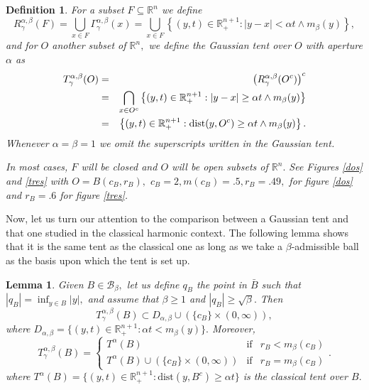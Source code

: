 \documentclass[leqno,11pt]{amsart}
\theoremstyle{plain}
\newtheorem{lemma}{Lemma}
\newtheorem{defi}{Definition}
\theoremstyle{remark}
\begin{document}
{\begin{defi}
For a subset $F\subseteq \mathbb{R}^n$ we define
\begin{equation}
R^{\alpha,\beta}_\gamma(F)=\bigcup_{x\in F} \Gamma_\gamma^{\alpha,\beta}(x)=\bigcup_{x\in F}\left\{(y,t)\in \mathbb{R}^{n+1}_+: |y-x|<\alpha t\wedge m_\beta(y)\right\},
\end{equation}
and for $O$ another subset of $\mathbb{R}^n,$ we define the \emph{Gaussian tent over} $O$ \emph{with aperture} $\alpha$ as
\begin{eqnarray}
 \nonumber  T^{\alpha, \beta}_\gamma(O)&=&\left(R^{\alpha, \beta}_\gamma (O^c)\right)^c\\
   \nonumber    &=&\bigcap_{x\in O^c}\left\{(y,t)\in \mathbb{R}^{n+1}_+: |y-x|\geq\alpha t\wedge m_\beta (y)\right\}\\
    &=&\left\{(y,t)\in \mathbb{R}^{n+1}_+: \hbox{dist}(y,O^c)\geq\alpha t\wedge m_\beta (y)\right\}.
\end{eqnarray}
Whenever $\alpha=\beta=1$ we omit the superscripts written in the Gaussian tent. 

\noindent In most cases, $F$ will be closed and $O$ will be open subsets of $\mathbb{R}^n.$ See Figures \ref{dos} and \ref{tres} with $O=B(c_B, r_B),$ $c_B=2, m(c_B)=.5, r_B=.49,$ for figure \ref{dos} and $r_B=.6$ for figure \ref{tres}.
\end{defi}



Now, let us turn our attention to the comparison between a Gaussian tent and that one studied in the classical harmonic context. The following lemma shows that it is the same tent as the classical one as long as we take a $\beta$-admissible ball as the basis upon which the tent is set up.
\begin{lemma}\label{GaussTent}
Given $B\in \mathscr{B}_\beta,$ let us define $q_B$ the point in $\bar{B}$ such that $|q_B|=\inf_{y\in B}|y|,$ and assume that $\beta\ge 1$ and $|q_B|\ge \sqrt{\beta}.$ Then $$T_\gamma^{\alpha, \beta}(B)\subset D_{\alpha, \beta}\cup (\{c_B\}\times (0, \infty)),$$ where $D_{\alpha,\beta}=\{(y,t)\in \mathbb{R}^{n+1}_+: \alpha t<m_\beta(y)\}.$ Moreover,
\begin{equation*}
T_\gamma^{\alpha, \beta}(B)=
\left\{\begin{array}{ccl}
T^\alpha(B) & \text{if} & r_B<m_\beta(c_B)\\
T^\alpha (B)\cup (\{c_B\}\times (0, \infty)) & \text{if} & r_B=m_\beta(c_B)
\end{array}\right. .
\end{equation*}
where  $T^\alpha(B)=\{(y,t)\in \mathbb{R}^{n+1}_+:\text{dist}(y,B^c)\ge \alpha t\}$ is the classical tent over $B.$
\end{lemma}

}
\end{document}
